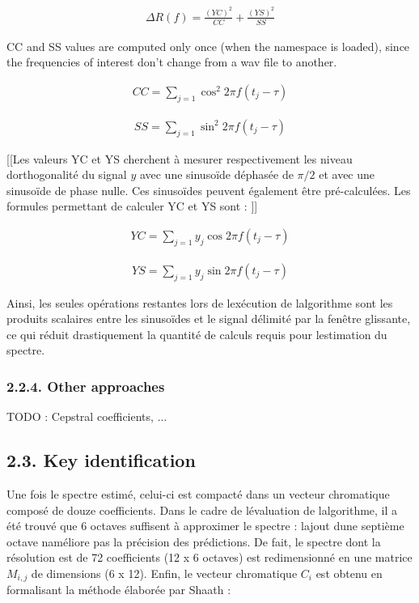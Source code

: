 \documentclass[letterpaper]{article}
\begin{document}
\begin{align}
\Delta R(f) = \frac{(YC)^{2}}{CC} 
+ \frac{(YS)^{2}}{SS}
\end{align}

CC and SS values are computed only once (when the namespace is loaded), since the frequencies of interest don’t change from a wav file to another.

\begin{align}
CC = \sum\limits_{j=1} \cos^{2} 2\pi f (t_{j} - \tau)
\end{align}

\begin{align}
SS = \sum\limits_{j=1} \sin^{2} 2\pi f (t_{j} - \tau)
\end{align}

[[Les valeurs YC et YS cherchent à mesurer respectivement les niveau d\textquotesingle orthogonalité du signal $y$ avec une sinusoïde déphasée de $\pi / 2$ et avec une sinusoïde de phase nulle. Ces sinusoïdes peuvent également être pré-calculées. Les formules permettant de calculer YC et YS sont : ]]

\begin{align}
YC = \sum\limits_{j=1} y_{j}\cos 2\pi f (t_{j} - \tau)
\end{align}

\begin{align}
YS = \sum\limits_{j=1} y_{j}\sin 2\pi f (t_{j} - \tau)
\end{align}

Ainsi, les seules opérations restantes lors de l\textquotesingle exécution de l\textquotesingle algorithme sont les produits scalaires entre les
sinusoïdes et le signal délimité par la fenêtre glissante, ce qui réduit drastiquement la quantité de calculs requis pour l\textquotesingle estimation du spectre.

\subsubsection*{2.2.4. Other approaches}

TODO : Cepstral coefficients, ...

\subsection*{2.3. Key identification}

Une fois le spectre estimé, celui-ci est compacté dans un vecteur chromatique composé de douze coefficients. Dans le cadre de l\textquotesingle évaluation de l\textquotesingle algorithme, il a été trouvé que 6 octaves suffisent à approximer le spectre : l\textquotesingle ajout d\textquotesingle une septième octave n\textquotesingle améliore pas la précision des prédictions. De fait, le spectre dont la résolution est de 72 coefficients (12 x 6 octaves) est redimensionné en une matrice $M_{i, j}$ de dimensions (6 x 12). Enfin, le vecteur chromatique $C_{i}$ est obtenu en formalisant la méthode élaborée par Sha\textquotesingle ath :
\end{document}
